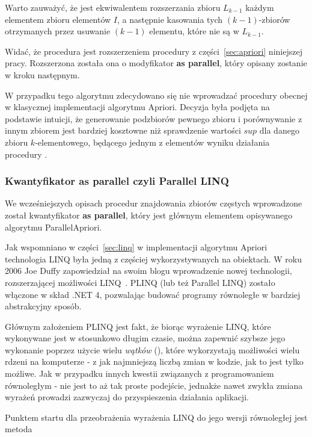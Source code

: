 Warto zauważyć, że  jest ekwiwalentem rozszerzania zbioru $L_{k-1}$ każdym elementem zbioru elementów $I$, a następnie kasowania tych $(k-1)$-zbiorów otrzymanych przez usuwanie $(k-1)$ elementu, które nie są w $L_{k-1}$. 

Widać, że procedura  jest rozszerzeniem procedury  z części~\ref{sec:apriori} niniejszej pracy. Rozszerzona została ona o modyfikator \textbf{as parallel}, który opisany zostanie w kroku następnym.

W przypadku tego algorytmu zdecydowano się nie wprowadzać procedury  obecnej w klasycznej implementacji algorytmu Apriori. Decyzja była podjęta na podstawie intuicji, że generowanie podzbiorów pewnego zbioru i porównywanie z innym zbiorem jest bardziej kosztowne niż sprawdzenie wartości $sup$ dla danego zbioru $k$-elementowego, będącego jednym z elementów wyniku działania procedury .

\subsubsection{Kwantyfikator as parallel czyli Parallel LINQ}\label{sec:asparallel}
We wcześniejszych opisach procedur znajdowania zbiorów częstych wprowadzone został kwantyfikator \textbf{as parallel}, który jest głównym elementem opisywanego algorytmu ParallelApriori. 

Jak wspomniano w części~\ref{sec:linq} w implementacji algorytmu Apriori technologia LINQ była jedną z częściej wykorzystywanych na obiektach. W roku 2006 Joe Duffy zapowiedział na swoim blogu wprowadzenie nowej technologii, rozszerzającej możliwości LINQ~\cite{cs:helloplinq}. PLINQ (lub też Parallel LINQ) zostało włączone w skład .NET 4, pozwalając budować programy równoległe w bardziej abstrakcyjny sposób. 

Głównym założeniem PLINQ jest fakt, że biorąc wyrażenie LINQ, które wykonywane jest w stosunkowo długim czasie, można zapewnić szybsze jego wykonanie poprzez użycie wielu \emph{wątków} (), które wykorzystają możliwości wielu rdzeni na komputerze - z jak najmniejszą liczbą zmian w kodzie, jak to jest tylko możliwe. Jak w przypadku innych kwestii związanych z programowaniem równoległym - nie jest to aż tak proste podejście, jednakże nawet zwykła zmiana wyrażeń prowadzi zazwyczaj do przyspieszenia działania aplikacji.

Punktem startu dla przeobrażenia wyrażenia LINQ do jego wersji równoległej jest metoda 

